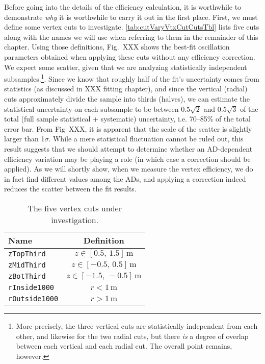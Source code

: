 \documentclass[../thesis.tex]{subfiles}
\begin{document}
Before going into the details of the efficiency calculation, it is worthwhile to demonstrate \emph{why} it is worthwhile to carry it out in the first place. First, we must define some vertex cuts to investigate. \autoref{tab:cutVaryVtxCutCutsTbl} lists five cuts along with the names we will use when referring to them in the remainder of this chapter. Using those definitions, Fig.~XXX shows the best-fit oscillation parameters obtained when applying these cuts without any efficiency correction. We expect some scatter, given that we are analyzing statistically independent subsamples.\footnote{More precisely, the three vertical cuts are statistically independent from each other, and likewise for the two radial cuts, but there \emph{is} a degree of overlap between each vertical and each radial cut. The overall point remains, however.}. Since we know that roughly half of the fit's uncertainty comes from statistics (as discussed in XXX fitting chapter), and since the vertical (radial) cuts approximately divide the sample into thirds (halves), we can estimate the statistical uncertainty on each subsample to be between $0.5\sqrt{2}$ and $0.5\sqrt{3}$ of the total (full sample statistical + systematic) uncertainty, i.e. 70--85\% of the total error bar. From Fig~XXX, it is apparent that the scale of the scatter is slightly larger than 1$\sigma$. While a mere statistical fluctuation cannot be ruled out, this result suggests that we should attempt to determine whether an AD-dependent efficiency variation may be playing a role (in which case a correction should be applied). As we will shortly show, when we measure the vertex efficiency, we do in fact find different values among the ADs, and applying a correction indeed reduces the scatter between the fit results.

\begin{comment}
(XXX note we haven't actually plotted the results of applying no efficiency correction. The scatter might be well above 1sigma in which case we need to reword the above.)
\end{comment}


\begin{table}[h]
  \begin{tabular}{lc}
    \toprule
    Name & Definition \\
    \midrule
    \texttt{zTopThird} & $z \in [0.5,\, 1.5]\,\mathrm{m}$ \\
    \texttt{zMidThird} & $z \in [-0.5,\, 0.5]\,\mathrm{m}$ \\
    \texttt{zBotThird} & $z \in [-1.5,\, -0.5]\,\mathrm{m}$ \\
    \texttt{rInside1000} & $r < 1\,\mathrm{m}$ \\
    \texttt{rOutside1000} & $r > 1\,\mathrm{m}$ \\
    \bottomrule
  \end{tabular}
  \caption{The five vertex cuts under investigation.}
  \label{tab:cutVaryVtxCutCutsTbl}
\end{table}
\end{document}
